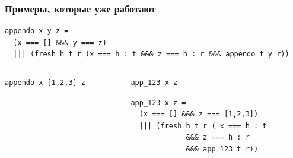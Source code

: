 \documentclass{beamer}
\begin{document}
\begin{frame}[fragile,t]
  \transwipe[direction=90]
  \frametitle{Примеры, которые уже работают}
\begin{center}
\begin{minipage}[c]{9.5cm}
\begin{lstlisting}[frame=single]  
appendo x y z = 
  (x === [] &&& y === z)
  ||| (fresh h t r (x === h : t &&& z === h : r &&& appendo t y r))
\end{lstlisting}
\end{minipage}
\end{center}

\begin{columns}[t]
\begin{column}{4.3cm}
\begin{badcode}
\begin{lstlisting}[frame=single]  
appendo x [1,2,3] z
\end{lstlisting}
\end{badcode}
\end{column}

\pause

\begin{column}{5.8cm}
\begin{mehcode}
\begin{lstlisting}[frame=single]  
app_123 x z 
\end{lstlisting}

\begin{lstlisting}[frame=single]  
app_123 x z = 
  (x === [] &&& z === [1,2,3])
  ||| (fresh h t r ( x === h : t 
             &&& z === h : r 
             &&& app_123 t r)) 
\end{lstlisting}
\end{mehcode}
\end{column}
\end{columns}
\end{frame}
\end{document}
